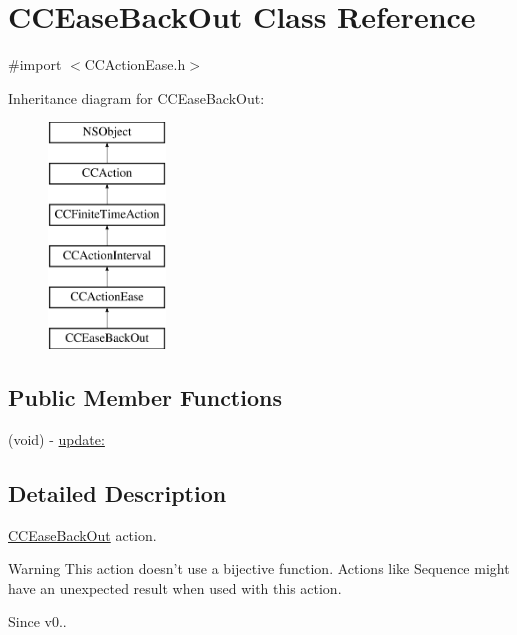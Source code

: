 \hypertarget{interface_c_c_ease_back_out}{\section{C\-C\-Ease\-Back\-Out Class Reference}
\label{interface_c_c_ease_back_out}
}


{\ttfamily \#import $<$C\-C\-Action\-Ease.\-h$>$}

Inheritance diagram for C\-C\-Ease\-Back\-Out\-:\begin{figure}[H]
\begin{center}
\leavevmode
\includegraphics[height=6.000000cm]{interface_c_c_ease_back_out}
\end{center}
\end{figure}
\subsection*{Public Member Functions}
\begin{DoxyCompactItemize}
\item 
(void) -\/ \hyperlink{interface_c_c_ease_back_out_a16251a93e5e880967a9d684de561775d}{update\-:}
\end{DoxyCompactItemize}


\subsection{Detailed Description}
\hyperlink{interface_c_c_ease_back_out}{C\-C\-Ease\-Back\-Out} action. \begin{DoxyWarning}{Warning}
This action doesn't use a bijective function. Actions like Sequence might have an unexpected result when used with this action. 
\end{DoxyWarning}
\begin{DoxySince}{Since}
v0.. 
\end{DoxySince}


